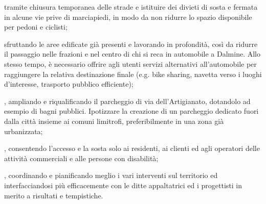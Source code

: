  tramite chiusura temporanea delle strade e istituire dei divieti di sosta e fermata in alcune vie prive di marciapiedi, in modo da non ridurre lo spazio disponibile per pedoni e ciclisti;

 sfruttando le aree edificate già presenti e lavorando in profondità, così da ridurre il passaggio nelle frazioni e nel centro di chi si reca in automobile a Dalmine. Allo stesso tempo, è necessario offrire agli utenti servizi alternativi all'automobile per raggiungere la relativa destinazione finale (e.g. bike sharing, navetta verso i luoghi d'interesse, trasporto pubblico efficiente);

, ampliando e riqualificando il parcheggio di via dell'Artigianato, dotandolo ad esempio di bagni pubblici. Ipotizzare la creazione di un parcheggio dedicato fuori dalla città insieme ai comuni limitrofi, preferibilmente in una zona già urbanizzata; 

, consentendo l'accesso e la sosta solo ai residenti, ai clienti ed agli operatori delle attività commerciali e alle persone con disabilità;

, coordinando e pianificando meglio i vari interventi sul territorio ed interfacciandosi più efficacemente con le ditte appaltatrici ed i progettisti in merito a risultati e tempistiche.
